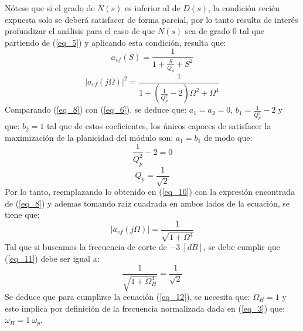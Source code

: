 \documentclass[12pt,a4paper]{article}
\begin{document}
\begin{itemize}
    Nótese que si el grado de $N(s)$ es inferior al de $D(s)$, la condición recién expuesta solo se deberá satisfacer de forma parcial, por lo tanto resulta de interés profundizar el análisis para el caso de que $N(s)$ sea de grado 0 tal que partiendo de (\ref{eq_5}) y aplicando esta condición, resulta que:
    \begin{equation}
        \label{eq_7}
        a_{vf}(S) = \frac{1}{1 + \frac{S}{Q_{p}} + S^2}
    \end{equation}
    \begin{equation}
        \label{eq_8}
        |a_{vf}(j\Omega)|^{2} = \frac{1}{1 + (\frac{1}{Q_{p}^{2}} - 2)\Omega^{2} + \Omega^{4}}
    \end{equation}
    Comparando (\ref{eq_8}) con (\ref{eq_6}), se deduce que: $a_{1} = a_{2} = 0$, $b_{1} = \frac{1}{Q_{p}^{2}} - 2$ y que: $b_{2} = 1$ tal que de estos coeficientes, los únicos capaces de satisfacer la maximización de la planicidad del módulo son: $a_{1} = b_{1}$ de modo que: 
    \begin{equation}
        \label{eq_9}
        \frac{1}{Q_{p}^{2}} - 2 = 0
    \end{equation}
    \begin{equation}
        \label{eq_10}
        Q_{p} = \frac{1}{\sqrt{2}}
    \end{equation}
     Por lo tanto, reemplazando lo obtenido en (\ref{eq_10}) con la expresión encontrada de (\ref{eq_8}) y ademas tomando raíz cuadrada en ambos lados de la ecuación, se tiene que:
     \begin{equation}
         \label{eq_11}
         |a_{vf}(j\Omega)| = \frac{1}{\sqrt{1 + \Omega^{4}}}
     \end{equation}
    Tal que si buscamos la frecuencia de corte de $-3 \ [dB]$, se debe cumplir que (\ref{eq_11}) debe ser igual a:
    \begin{equation}
        \label{eq_12}
        \frac{1}{\sqrt{1 + \Omega_H^{4}}} = \frac{1}{\sqrt{2}}
    \end{equation}
    Se deduce que para cumplirse la ecuación (\ref{eq_12}), se necesita que: $\Omega_H = 1$ y esto implica por definición de la frecuencia normalizada dada en (\ref{eq_3}) que: $\omega_H = 1 \ \omega_p$.


\end{itemize}
\end{document}
